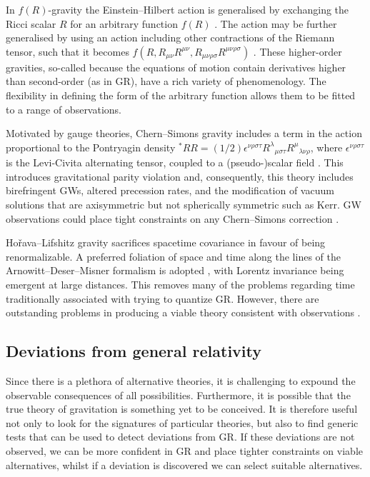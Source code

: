 In $f(R)$-gravity the Einstein--Hilbert action is generalised by exchanging the Ricci scalar $R$ for an arbitrary function $f(R)$ \citep{Buchdahl1970, Sotiriou2010, DeFelice2010}. The action may be further generalised by using an action including other contractions of the Riemann tensor, such that it becomes $f(R, R_{\mu\nu}R^{\mu\nu}, R_{\mu\nu\rho\sigma}R^{\mu\nu\rho\sigma})$ \citep{Madsen1989, Farhoudi2006, Nojiri2011}. These higher-order gravities, so-called because the equations of motion contain derivatives higher than second-order (as in GR), have a rich variety of phenomenology. The flexibility in defining the form of the arbitrary function allows them to be fitted to a range of observations.

Motivated by gauge theories, Chern--Simons gravity includes a term in the action proportional to the Pontryagin density ${^\ast R} R = (1/2)\epsilon^{\nu\rho\sigma\tau}{R^\lambda}_{\mu\sigma\tau}{R^\mu}_{\lambda\nu\rho}$, where $\epsilon^{\nu\rho\sigma\tau}$ is the Levi-Civita alternating tensor, coupled to a (pseudo-)scalar field \citep{Jackiw2003, Smith2008, Alexander2009a}. This introduces gravitational parity violation and, consequently, this theory includes birefringent GWs, altered precession rates, and the modification of vacuum solutions that are axisymmetric but not spherically symmetric such as Kerr. GW observations could place tight constraints on any Chern--Simons correction \citep{Canizares2012}.

Ho\v{r}ava--Lifshitz gravity \citep{Horava2009, Sotiriou2009c, Blas2010a} sacrifices spacetime covariance in favour of being renormalizable. A preferred foliation of space and time along the lines of the Arnowitt--Deser--Misner formalism is adopted \citep{Arnowitt1962a}, with Lorentz invariance being emergent at large distances. This removes many of the problems regarding time traditionally associated with trying to quantize GR. However, there are outstanding problems in producing a viable theory consistent with observations \citep{Sotiriou2010a}.

\subsection{Deviations from general relativity}

Since there is a plethora of alternative theories, it is challenging to expound the observable consequences of all possibilities. Furthermore, it is possible that the true theory of gravitation is something yet to be conceived. It is therefore useful not only to look for the signatures of particular theories, but also to find generic tests that can be used to detect deviations from GR. If these deviations are not observed, we can be more confident in GR and place tighter constraints on viable alternatives, whilst if a deviation is discovered we can select suitable alternatives.

